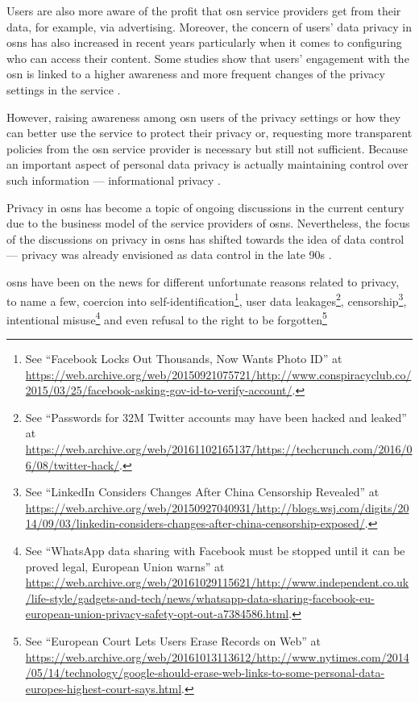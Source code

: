 Users are also more aware of the profit that \ac{osn} service providers get from 
their data, for example, via advertising. Moreover, the concern of users' data privacy 
in \acp{osn} has also increased in recent years particularly when it comes to configuring 
who can access their content. Some studies show that users' engagement with the 
\ac{osn} is linked to a higher awareness and more frequent changes of the privacy 
settings in the service \cite{boydH10}.

However, raising awareness among \ac{osn} users of the privacy settings or how they 
can better use the service to protect their privacy or, requesting more transparent 
policies from the \ac{osn} service provider is necessary but still not sufficient. 
Because an important aspect of personal data privacy is actually maintaining control 
over such information --- informational privacy \cite{Cavoukian96}.

Privacy in \acp{osn} has become a topic of ongoing discussions in the current century 
due to the business model of the service providers of \acp{osn}. Nevertheless, the 
focus of the discussions on privacy in \acp{osn} has shifted towards the idea of 
data control --- privacy was already envisioned as data control in the late 90s 
\cite{Allen99}.

\acp{osn} have been on the news for different unfortunate reasons related to privacy, 
to name a few, coercion into self-identification\footnote{See ``Facebook Locks Out Thousands, Now Wants Photo ID'' at \url{https://web.archive.org/web/20150921075721/http://www.conspiracyclub.co/2015/03/25/facebook-asking-gov-id-to-verify-account/}.}, 
user data leakages\footnote{See ``Passwords for 32M Twitter accounts may have been hacked and leaked'' at \url{https://web.archive.org/web/20161102165137/https://techcrunch.com/2016/06/08/twitter-hack/}.}, 
censorship\footnote{See ``LinkedIn Considers Changes After China Censorship Revealed'' at \url{https://web.archive.org/web/20150927040931/http://blogs.wsj.com/digits/2014/09/03/linkedin-considers-changes-after-china-censorship-exposed/}.}, 
intentional misuse\footnote{See ``WhatsApp data sharing with Facebook must be stopped until it can be proved legal, European Union warns'' at \url{https://web.archive.org/web/20161029115621/http://www.independent.co.uk/life-style/gadgets-and-tech/news/whatsapp-data-sharing-facebook-eu-european-union-privacy-safety-opt-out-a7384586.html}.} 
and even refusal to the right to be forgotten\footnote{See ``European Court Lets Users Erase Records on Web'' at \url{https://web.archive.org/web/20161013113612/http://www.nytimes.com/2014/05/14/technology/google-should-erase-web-links-to-some-personal-data-europes-highest-court-says.html}.}


